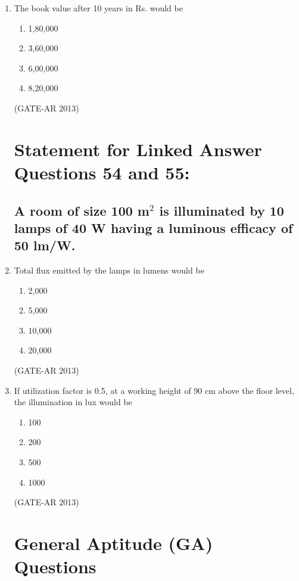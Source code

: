 \documentclass[a4paper,10pt]{article}
\begin{document}
\begin{enumerate}
    \item The book value after 10 years in Rs. would be
    \begin{multicols}{4}
	\begin{enumerate}
        \item 1,80,000
        \item 3,60,000
        \item 6,00,000
        \item 8,20,000
    \end{enumerate}
	\end{multicols}
    \hfill (GATE-AR 2013)

\section*{Statement for Linked Answer Questions 54 and 55:}
\subsection*{A room of size 100 m$^2$ is illuminated by 10 lamps of 40 W having a luminous efficacy of 50 lm/W.}

    \item Total flux emitted by the lamps in lumens would be
    \begin{multicols}{4}
	\begin{enumerate}
        \item 2,000
        \item 5,000
        \item 10,000
        \item 20,000
    \end{enumerate}
	\end{multicols}
    \hfill (GATE-AR 2013)

    \item If utilization factor is 0.5, at a working height of 90 cm above the floor level, the illumination in lux would be
    \begin{multicols}{4}
	\begin{enumerate}
        \item 100
        \item 200
        \item 500
        \item 1000
    \end{enumerate}
	\end{multicols}
    \hfill (GATE-AR 2013)

\section*{General Aptitude (GA) Questions}


\end{enumerate}
\end{document}
